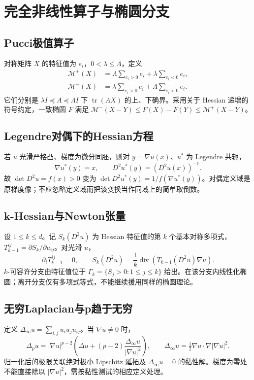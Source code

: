 \documentclass[../main.tex]{subfiles}
\begin{document}
\section{完全非线性算子与椭圆分支}
\subsection{Pucci极值算子}
对称矩阵 $X$ 的特征值为 $e_i$，$0<\lambda\le\Lambda$，定义
\begin{align*}
\mathcal M^+(X)&=\Lambda\sum_{e_i>0}e_i+\lambda\sum_{e_i<0}e_i,\\
\mathcal M^-(X)&=\lambda\sum_{e_i>0}e_i+\Lambda\sum_{e_i<0}e_i.
\end{align*}
它们分别是 $\lambda I\preceq A\preceq\Lambda I$ 下 $\operatorname{tr}(AX)$ 的上、下确界。采用关于 Hessian 递增的符号约定，一致椭圆 $F$ 满足 $\mathcal M^-(X-Y)\le F(X)-F(Y)\le\mathcal M^+(X-Y)$。
\subsection{Legendre对偶下的Hessian方程}
若 $u$ 光滑严格凸、梯度为微分同胚，则对 $y=\nabla u(x)$、$u^*$ 为 Legendre 共轭，
\[
\nabla u^*(y)=x,\qquad D^2u^*(y)=(D^2u(x))^{-1}.
\]
故 $\det D^2u=f(x)>0$ 变为 $\det D^2u^*(y)=1/f(\nabla u^*(y))$。对偶定义域是原梯度像；不应忽略定义域而把该变换当作同域上的简单取倒数。
\subsection{k-Hessian与Newton张量}
设 $1\le k\le d$。记 $S_k(D^2u)$ 为 Hessian 特征值的第 $k$ 个基本对称多项式，$T_{k-1}^{ij}=\partial S_k/\partial u_{ij}$。对光滑 $u$，
\[
\partial_iT_{k-1}^{ij}=0,\qquad
S_k(D^2u)=\frac1k\operatorname{div}(T_{k-1}(D^2u)\nabla u).
\]
$k$-可容许分支由特征值位于 $\Gamma_k=\{S_j>0:1\le j\le k\}$ 给出。在该分支内线性化椭圆；离开分支仅有多项式等式，不能继续援用同样的椭圆理论。
\subsection{无穷Laplacian与p趋于无穷}
定义 $\Delta_\infty u=\sum_{i,j}u_i u_j u_{ij}$。当 $\nabla u\ne0$ 时，
\[
\Delta_pu=|\nabla u|^{p-2}
\left(\Delta u+(p-2)\frac{\Delta_\infty u}{|\nabla u|^2}\right),\qquad
\Delta_\infty u=\tfrac12\nabla u\cdot\nabla|\nabla u|^2.
\]
归一化后的极限关联绝对极小 Lipschitz 延拓及 $\Delta_\infty u=0$ 的黏性解。梯度为零处不能直接除以 $|\nabla u|^2$，需按黏性测试的相应定义处理。
\end{document}
